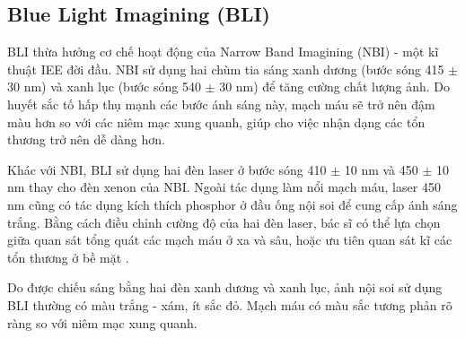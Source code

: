 \documentclass[12pt]{extreport}
\begin{document}
\subsection{Blue Light Imagining (BLI)}

BLI thừa hưởng cơ chế hoạt động của Narrow Band Imagining (NBI) - một kĩ thuật IEE đời đầu. NBI sử dụng hai chùm tia sáng xanh dương (bước sóng 415 $ \pm $ 30 nm) và xanh lục (bước sóng 540 $ \pm $ 30 nm) để tăng cường chất lượng ảnh. Do huyết sắc tố hấp thụ mạnh các bước ánh sáng này, mạch máu sẽ trở nên đậm màu hơn so với các niêm mạc xung quanh, giúp cho việc nhận dạng các tổn thương trở nên dễ dàng hơn.

Khác với NBI, BLI sử dụng hai đèn laser ở bước sóng 410 $ \pm $ 10 nm và 450 $ \pm $ 10 nm thay cho đèn xenon của NBI. Ngoài tác dụng làm nổi mạch máu, laser 450 nm cũng có tác dụng kích thích phosphor ở đầu ống nội soi để cung cấp ánh sáng trắng. Bằng cách điều chỉnh cường độ của hai đèn laser, bác sĩ có thể lựa chọn giữa quan sát tổng quát các mạch máu ở xa và sâu, hoặc ưu tiên quan sát kĩ các tổn thương ở bề mặt \cite{pmid26770267}.

Do được chiếu sáng bằng hai đèn xanh dương và xanh lục, ảnh nội soi sử dụng BLI thường có màu trắng - xám, ít sắc đỏ. Mạch máu có màu sắc tương phản rõ ràng so với niêm mạc xung quanh.
\end{document}
